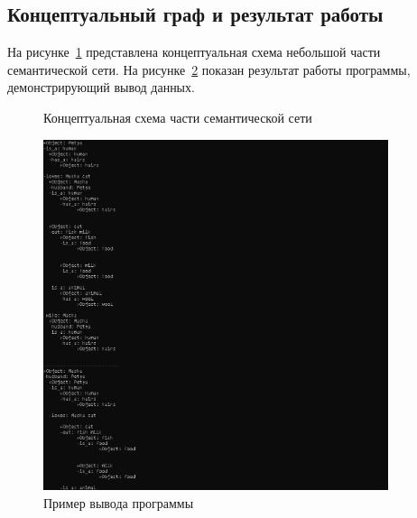 \documentclass[12pt,a4paper]{scrartcl}
\begin{document}
	\subsection{Концептуальный граф и результат работы}
	\label{sec:intro:graph}
	На рисунке~\ref{fig:graph} представлена концептуальная схема небольшой части семантической сети. На рисунке~\ref{fig:screenshot} показан результат работы программы, демонстрирующий вывод данных.
	
	\begin{figure}[h!]
		\centering
		\caption{Концептуальная схема части семантической сети}\label{fig:graph}
	\end{figure}
	
	\begin{figure}[h!]
		\centering
		\includegraphics[width=0.9\textwidth]{Output.png}
		\caption{Пример вывода программы}\label{fig:screenshot}
	\end{figure}
	
\end{document}
